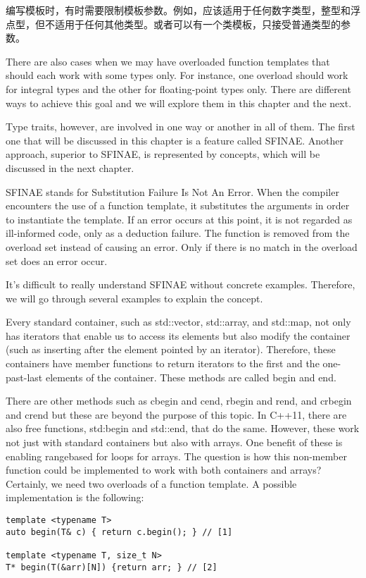 编写模板时，有时需要限制模板参数。例如，应该适用于任何数字类型，整型和浮点型，但不适用于任何其他类型。或者可以有一个类模板，只接受普通类型的参数。

There are also cases when we may have overloaded function templates that should each work with some types only. For instance, one overload should work for integral types and the other for floating-point types only. There are different ways to achieve this goal and we will explore them in this chapter and the next.

Type traits, however, are involved in one way or another in all of them. The first one that will be discussed in this chapter is a feature called SFINAE. Another approach, superior to SFINAE, is represented by concepts, which will be discussed in the next chapter.

SFINAE stands for Substitution Failure Is Not An Error. When the compiler encounters the use of a function template, it substitutes the arguments in order to instantiate the template. If an error occurs at this point, it is not regarded as ill-informed code, only as a deduction failure. The function is removed from the overload set instead of causing an error. Only if there is no match in the overload set does an error occur.

It’s difficult to really understand SFINAE without concrete examples. Therefore, we will go through several examples to explain the concept.

Every standard container, such as std::vector, std::array, and std::map, not only has iterators that enable us to access its elements but also modify the container (such as inserting after the element pointed by an iterator). Therefore, these containers have member functions to return iterators to the first and the one-past-last elements of the container. These methods are called begin and end.

There are other methods such as cbegin and cend, rbegin and rend, and crbegin and crend but these are beyond the purpose of this topic. In C++11, there are also free functions, std:begin and std::end, that do the same. However, these work not just with standard containers but also with arrays. One benefit of these is enabling rangebased for loops for arrays. The question is how this non-member function could be implemented to work with both containers and arrays? Certainly, we need two overloads of a function template. A possible implementation is the following:

\begin{lstlisting}[style=styleCXX]
template <typename T>
auto begin(T& c) { return c.begin(); } // [1]

template <typename T, size_t N>
T* begin(T(&arr)[N]) {return arr; } // [2]
\end{lstlisting}

